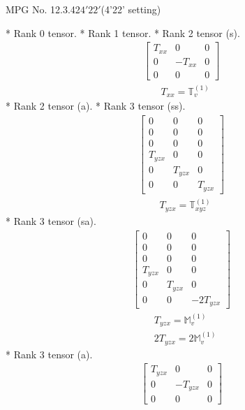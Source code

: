 \documentclass[fleqn,8pt,landscape]{jsarticle}
\begin{document}
\setcounter{MaxMatrixCols}{32}

\renewcommand{\tablename}{Table~}
\renewcommand{\figurename}{Figure~}
\begin{center}
\LARGE
MPG No. 12.3.42\quad$4'22'$\quad(4'22' setting)
\end{center}
* Rank 0 tensor.
* Rank 1 tensor.
* Rank 2 tensor (s).
\begin{align*}
\begin{bmatrix} T_{xx} & 0 & 0 \\ 0 & - T_{xx} & 0 \\ 0 & 0 & 0 \end{bmatrix}
\end{align*}
\begin{align*}
& T_{xx} = \mathbb{T}_{v}^{(1)}
\end{align*}
* Rank 2 tensor (a).
* Rank 3 tensor (ss).
\begin{align*}
\begin{bmatrix} 0 & 0 & 0 \\ 0 & 0 & 0 \\ 0 & 0 & 0 \\ T_{yzx} & 0 & 0 \\ 0 & T_{yzx} & 0 \\ 0 & 0 & T_{yzx} \end{bmatrix}
\end{align*}
\begin{align*}
& T_{yzx} = \mathbb{T}_{xyz}^{(1)}
\end{align*}
* Rank 3 tensor (sa).
\begin{align*}
\begin{bmatrix} 0 & 0 & 0 \\ 0 & 0 & 0 \\ 0 & 0 & 0 \\ T_{yzx} & 0 & 0 \\ 0 & T_{yzx} & 0 \\ 0 & 0 & - 2 T_{yzx} \end{bmatrix}
\end{align*}
\begin{align*}
& T_{yzx} = \mathbb{M}_{v}^{(1)} \\
& 2 T_{yzx} = 2 \mathbb{M}_{v}^{(1)}
\end{align*}
* Rank 3 tensor (a).
\begin{align*}
\begin{bmatrix} T_{yzx} & 0 & 0 \\ 0 & - T_{yzx} & 0 \\ 0 & 0 & 0 \end{bmatrix}
\end{align*}
\end{document}
